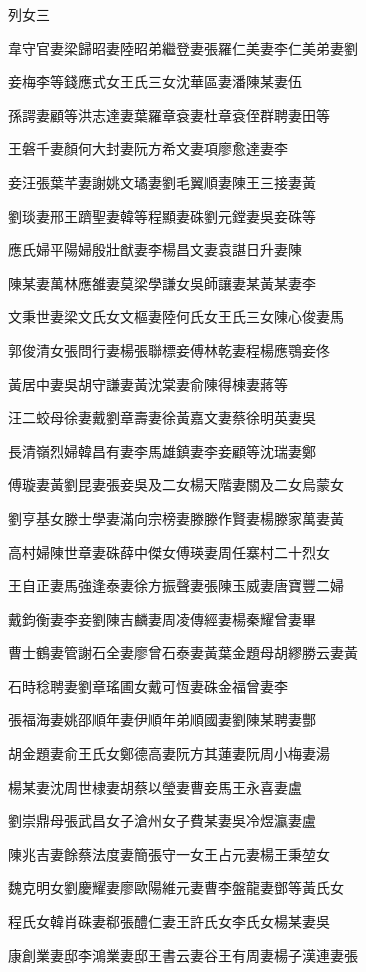 
\begin{pinyinscope}
列女三

韋守官妻梁歸昭妻陸昭弟繼登妻張羅仁美妻李仁美弟妻劉

妾梅李等錢應式女王氏三女沈華區妻潘陳某妻伍

孫諤妻顧等洪志達妻葉羅章袞妻杜章袞侄群聘妻田等

王磐千妻顏何大封妻阮方希文妻項廖愈達妻李

妾汪張葉芊妻謝姚文璚妻劉毛翼順妻陳王三接妻黃

劉琰妻邢王躋聖妻韓等程顯妻硃劉元鏜妻吳妾硃等

應氏婦平陽婦殷壯猷妻李楊昌文妻袁諶日升妻陳

陳某妻萬林應雒妻莫梁學謙女吳師讓妻某黃某妻李

文秉世妻梁文氏女文樞妻陸何氏女王氏三女陳心俊妻馬

郭俊清女張問行妻楊張聯標妾傅林乾妻程楊應鶚妾佟

黃居中妻吳胡守謙妻黃沈棠妻俞陳得棟妻蔣等

汪二蛟母徐妻戴劉章壽妻徐黃嘉文妻蔡徐明英妻吳

長清嶺烈婦韓昌有妻李馬雄鎮妻李妾顧等沈瑞妻鄭

傅璇妻黃劉昆妻張妾吳及二女楊天階妻關及二女烏蒙女

劉亨基女滕士學妻滿向宗榜妻滕滕作賢妻楊滕家萬妻黃

高村婦陳世章妻硃薛中傑女傅瑛妻周任寨村二十烈女

王自正妻馬強逢泰妻徐方振聲妻張陳玉威妻唐寶豐二婦

戴鈞衡妻李妾劉陳吉麟妻周凌傳經妻楊秦耀曾妻畢

曹士鶴妻管謝石全妻廖曾石泰妻黃葉金題母胡繆勝云妻黃

石時稔聘妻劉章瑤圃女戴可恆妻硃金福曾妻李

張福海妻姚邵順年妻伊順年弟順國妻劉陳某聘妻酆

胡金題妻俞王氏女鄭德高妻阮方其蓮妻阮周小梅妻湯

楊某妻沈周世棣妻胡蔡以瑩妻曹妾馬王永喜妻盧

劉崇鼎母張武昌女子滄州女子費某妻吳冷煜瀛妻盧

陳兆吉妻餘蔡法度妻簡張守一女王占元妻楊王秉堃女

魏克明女劉慶耀妻廖歐陽維元妻曹李盤龍妻鄧等黃氏女

程氏女韓肖硃妻郗張醴仁妻王許氏女李氏女楊某妻吳

康創業妻邸李鴻業妻邸王書云妻谷王有周妻楊子漢連妻張


\end{pinyinscope}
